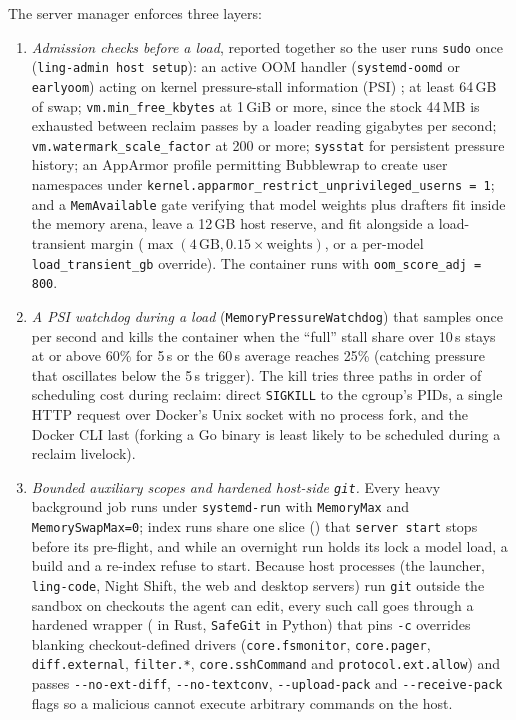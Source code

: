 \documentclass[11pt]{article}
\newcommand{\code}[1]{\texttt{#1}}
\begin{document}
The server manager enforces three layers:
\begin{enumerate}
\item \emph{Admission checks before a load}, reported together so the user runs \code{sudo} once
(\code{ling-admin host setup}): an active OOM handler (\code{systemd-oomd} or \code{earlyoom})
acting on kernel pressure-stall information (PSI) \cite{linuxpsi}; at least 64\,GB of swap;
\code{vm.min\_free\_kbytes} at 1\,GiB or more, since the stock 44\,MB is exhausted between reclaim
passes by a loader reading gigabytes per second; \code{vm.watermark\_scale\_factor} at 200 or more;
\code{sysstat} for persistent pressure history; an AppArmor profile permitting Bubblewrap to create
user namespaces under \code{kernel.apparmor\_restrict\_unprivileged\_userns = 1}; and a
\code{MemAvailable} gate verifying that model weights plus drafters fit inside the memory arena,
leave a 12\,GB host reserve, and fit alongside a load-transient margin ($\max(4\,\text{GB},
0.15\times\text{weights})$, or a per-model \code{load\_transient\_gb} override). The container runs
with \code{oom\_score\_adj = 800}.
\item \emph{A PSI watchdog during a load} (\code{MemoryPressureWatchdog}) that samples
 once per second and kills the container when the ``full'' stall share
over 10\,s stays at or above 60\% for 5\,s or the 60\,s average reaches 25\% (catching pressure that
oscillates below the 5\,s trigger). The kill tries three paths in order of scheduling cost during
reclaim: direct \code{SIGKILL} to the cgroup's PIDs, a single HTTP request over Docker's Unix
socket with no process fork, and the Docker CLI last (forking a Go binary is least likely to be
scheduled during a reclaim livelock).
\item \emph{Bounded auxiliary scopes and hardened host-side \code{git}.} Every heavy background job
runs under \code{systemd-run} with \code{MemoryMax} and \code{MemorySwapMax=0}; index runs share one
slice () that \code{server start} stops before its pre-flight, and while
an overnight run holds its lock a model load, a build and a re-index refuse to start. Because host
processes (the launcher, \code{ling-code}, Night Shift, the web and desktop servers) run \code{git}
outside the sandbox on checkouts the agent can edit, every such call goes through a hardened wrapper
( in Rust, \code{SafeGit} in Python) that pins \code{-c} overrides blanking
checkout-defined drivers (\code{core.fsmonitor}, \code{core.pager}, \code{diff.external},
\code{filter.*}, \code{core.sshCommand} and \code{protocol.ext.allow}) and passes
\code{-{}-no-ext-diff}, \code{-{}-no-textconv}, \code{-{}-upload-pack} and \code{-{}-receive-pack}
flags so a malicious  cannot execute arbitrary commands on the host.
\end{enumerate}
\end{document}
